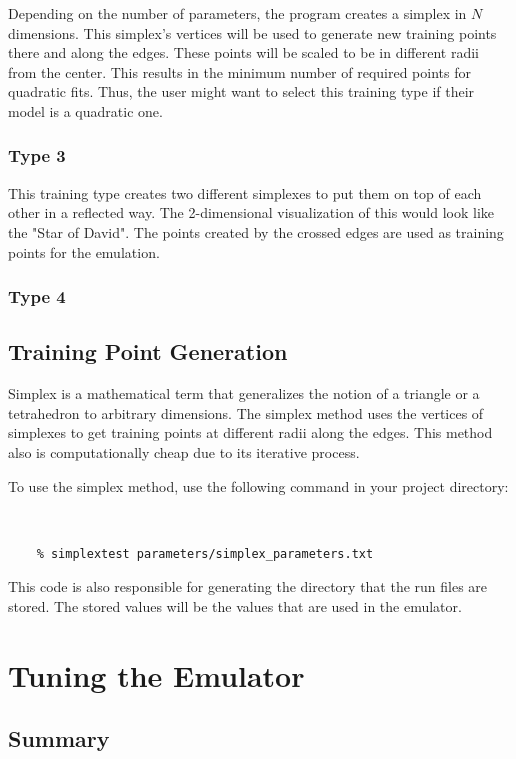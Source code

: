 \documentclass[12pt]{article}
\numberwithin{equation}{section}
\numberwithin{figure}{section}
\begin{document}
 Depending on the number of parameters, the program creates a simplex in $N$ dimensions. This simplex's vertices will be used to generate new training points there and along the edges. These points will be scaled to be in different radii from the center. This results in the minimum number of required points for quadratic fits. Thus, the user might want to select this training type if their model is a quadratic one.
 
\subsubsection{Type 3}
This training type creates two different simplexes to put them on top of each other in a reflected way. The 2-dimensional visualization of this would look like the "Star of David". The points created by the crossed edges are used as training points for the emulation.
 
\subsubsection{Type 4}

\subsection{Training Point Generation}

Simplex is a mathematical term that generalizes the notion of a triangle or a tetrahedron to arbitrary dimensions. The simplex method uses the vertices of simplexes to get training points at different radii along the edges. This method also is computationally cheap due to its iterative process.

To use the simplex method, use the following command in your project directory:

{\tt
{
\begin{verbatim}
    % simplextest parameters/simplex_parameters.txt
\end{verbatim}
}}

This code is also responsible for generating the directory that the run files are stored. The stored values will be the values that are used in the emulator.

\section{Tuning the Emulator}

\subsection{Summary}
\end{document}

